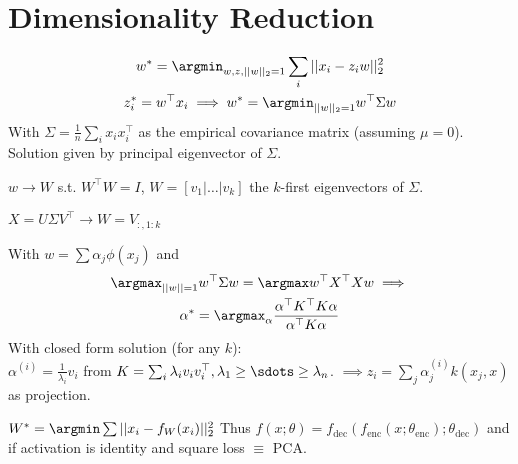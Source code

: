\section{Dimensionality Reduction} \vspace{-11pt}
\begin{gather*}
  w^* = \argmin_{w, z, ||w||_2 = 1} \sum_i ||x_i - z_i w||_2^2 \\
  z_i^* = w^\top x_i \implies w^* = \argmin_{||w||_2 = 1} w^\top \Sigma w
\end{gather*}
With \(\Sigma = \frac{1}{n} \sum_i x_i x_i^\top\) as the empirical covariance matrix (assuming \(\mu = 0\)). Solution given by principal eigenvector of \(\Sigma\).

\begin{definition}
  \(w \to W\) s.t. \(W^\top W = I\), \(W = [v_1 | \ldots | v_k]\) the \(k\)-first eigenvectors of \(\Sigma\).
\end{definition}

\begin{definition}
  \(X = U \Sigma V^\top \to W = V_{:, 1:k}\)
\end{definition}

\begin{definition}
  With \(w = \sum \alpha_j \phi(x_j)\) and
  \begin{gather*}
    \argmax_{||w|| = 1} w^\top \Sigma w = \argmax w^\top X^\top X w \implies \\
    \alpha^* = \argmax_\alpha \frac{\alpha^\top K^\top K \alpha}{\alpha^\top K \alpha}
  \end{gather*} 
  With closed form solution (for any \(k\)): \\
  \(\alpha^{(i)} = \frac{1}{\lambda_i} v_i\) from \(K = \sum_i \lambda_i v_i v_i^\top, \lambda_1 \geq \sdots \geq \lambda_n\).
  \(\implies z_i = \sum_j \alpha_j^{(i)} k(x_j, x)\) as projection.
\end{definition}

\begin{definition}[Autoencoder]
  \(W^* = \argmin \sum ||x_i - f_W(x_i)||_2^2\)
  Thus \(f(x; \theta) = f_{\text{dec}}(f_{\text{enc}}(x ; \theta_{\text{enc}}); \theta_{\text{dec}})\) and if activation is identity and square loss \(\equiv\) PCA.
\end{definition}